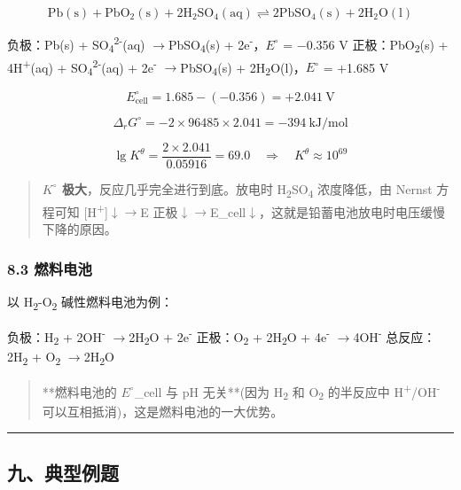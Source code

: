 \documentclass[a4paper,11pt]{ctexart}
\newcommand{\箭}{\ensuremath{\rightarrow}}
\newcommand{\左箭}{\ensuremath{\leftarrow}}
\newcommand{\上箭}{\ensuremath{\uparrow}}
\newcommand{\下箭}{\ensuremath{\downarrow}}
\newcommand{\衡}{\ensuremath{\rightleftharpoons}}
\newcommand{\双箭}{\ensuremath{\leftrightarrow}}
\newcommand{\约等于}{\ensuremath{\approx}}
\newcommand{\小于等于}{\ensuremath{\leq}}
\newcommand{\大于等于}{\ensuremath{\geq}}
\newcommand{\不等于}{\ensuremath{\neq}}
\newcommand{\西格马}{\ensuremath{\sigma}}
\newcommand{\派}{\ensuremath{\pi}}
\begin{document}
\[
\mathrm{Pb(s) + PbO_2(s) + 2H_2SO_4(aq) \rightleftharpoons 2PbSO_4(s) + 2H_2O(l)}
\]

负极：Pb(s) + SO\textsubscript{4}\textsuperscript{2-}(aq) \箭 PbSO\textsubscript{4}(s) + 2e\textsuperscript{-}，\(E^{\circ}\) = −0.356 V
正极：PbO\textsubscript{2}(s) + 4H\textsuperscript{+}(aq) + SO\textsubscript{4}\textsuperscript{2-}(aq) + 2e\textsuperscript{-} \箭 PbSO\textsubscript{4}(s) + 2H\textsubscript{2}O(l)，\(E^{\circ}\) = +1.685 V

\[E^\circ_{\text{cell}} = 1.685 - (-0.356) = +2.041\ \mathrm{V}\]

\[\Delta_rG^\circ = -2 \times 96485 \times 2.041 = -394\ \mathrm{kJ/mol}\]

\[\lg K^\theta = \frac{2 \times 2.041}{0.05916} = 69.0 \quad \Rightarrow \quad K^\theta \approx 10^{69}\]

\begin{quote}
\textbf{\(K^{\circ}\) 极大}，反应几乎完全进行到底。放电时 H\textsubscript{2}SO\textsubscript{4} 浓度降低，由 Nernst 方程可知 {[}H\textsuperscript{+}{]}\下箭 \箭 E 正极\下箭 \箭 E\_cell\下箭，这就是铅蓄电池放电时电压缓慢下降的原因。
\end{quote}

\subsubsection{8.3 燃料电池}\label{ux71c3ux6599ux7535ux6c60}

以 H\textsubscript{2}-O\textsubscript{2} 碱性燃料电池为例：

负极：H\textsubscript{2} + 2OH\textsuperscript{-} \箭 2H\textsubscript{2}O + 2e\textsuperscript{-}
正极：O\textsubscript{2} + 2H\textsubscript{2}O + 4e\textsuperscript{-} \箭 4OH\textsuperscript{-}
总反应：2H\textsubscript{2} + O\textsubscript{2} \箭 2H\textsubscript{2}O

\begin{quote}
**燃料电池的 \(E^{\circ}\)\_cell 与 pH 无关**(因为 H\textsubscript{2} 和 O\textsubscript{2} 的半反应中 H\textsuperscript{+}/OH\textsuperscript{-} 可以互相抵消)，这是燃料电池的一大优势。
\end{quote}

\begin{center}\rule{0.5\linewidth}{0.5pt}\end{center}

\subsection{九、典型例题}\label{ux4e5dux5178ux578bux4f8bux9898}
\end{document}
